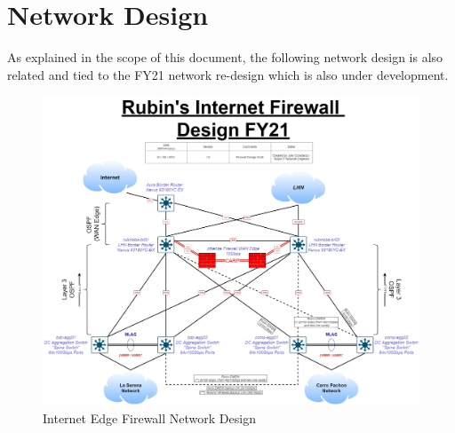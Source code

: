 \section{Network Design}

As explained in the scope of this document, the following network design is also related and tied to the FY21 network re-design which is also under development.

\begin{figure}
    \includegraphics[width=\linewidth]{images/fw_design.jpg}
    \centering
    \caption{Internet Edge Firewall Network Design}
  \end{figure}